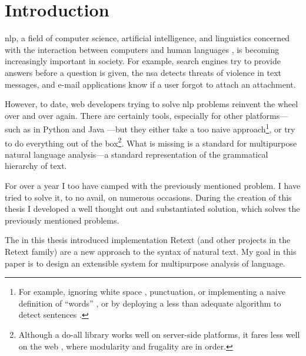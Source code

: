 
\begingroup
\let\clearpage\relax
\let\cleardoublepage\relax
\let\cleardoublepage\relax

\chapter*{Introduction}

\Gls{nlp}, a field of computer science, artificial intelligence, and
linguistics concerned with the interaction between computers and human
languages \autocite[according to WikiPedia, see
][]{wikipedia-natural-language-processing}, is becoming increasingly
important in society. For example, search engines try to provide answers
before a question is given, the \gls{nsa} detects threats of violence in text
messages, and e-mail applications know if a user forgot to attach an
attachment.

However, to date, web developers trying to solve \gls{nlp} problems
reinvent the wheel over and over again. There are certainly tools,
especially for other platforms---such as in Python
\autocite{nltk-source} and Java \autocite{opennlp-source}---but they either
take a too naive approach\footnote{For example, ignoring white space
  \autocite[see][]{loadfive/knwl-source-code}, punctuation, or
  implementing a naive definition of ``words'' \autocite[such
  as][]{nhunzaker/speakeasy-source-code}, or by deploying a less than
  adequate algorithm to detect sentences \autocite[such
  as][]{nytimes/emphasis-source-code}.}, or try to do everything out of
the box\footnote{Although a do-all library works well on server-side
  platforms, it fares less well on the web \autocite[such
  as][]{NaturalNode/natural-source-code}, where modularity and frugality
  are in order.}. What is missing is a standard for multipurpose natural
language analysis---a standard representation of the grammatical
hierarchy of text.

For over a year I too have camped with the previously mentioned problem.
I have tried to solve it, to no avail, on numerous occasions. During the
creation of this thesis I developed a well thought out and substantiated
solution, which solves the previously mentioned problems.

The in this thesis introduced implementation Retext (and other projects
in the Retext family) are a new approach to the syntax of natural text.
My goal in this paper is to design an extensible system for multipurpose
analysis of language.

